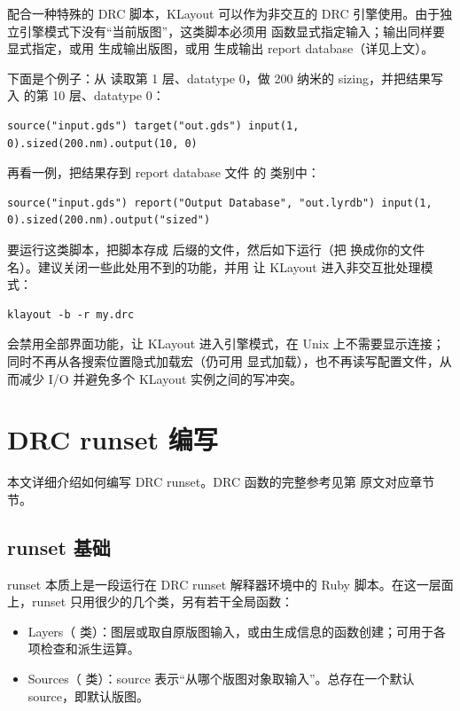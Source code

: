 配合一种特殊的 DRC 脚本，KLayout 可以作为非交互的 DRC 引擎使用。由于独立引擎模式下没有“当前版图”，这类脚本必须用  函数显式指定输入；输出同样要显式指定，或用  生成输出版图，或用  生成输出 report database（详见上文）。

下面是个例子：从  读取第 1 层、datatype 0，做 200 纳米的 sizing，并把结果写入  的第 10 层、datatype 0：

\begin{lstlisting}
source("input.gds") target("out.gds") input(1, 0).sized(200.nm).output(10, 0)
\end{lstlisting}

再看一例，把结果存到 report database 文件  的  类别中：

\begin{lstlisting}
source("input.gds") report("Output Database", "out.lyrdb") input(1, 0).sized(200.nm).output("sized")
\end{lstlisting}

要运行这类脚本，把脚本存成  后缀的文件，然后如下运行（把  换成你的文件名）。建议关闭一些此处用不到的功能，并用  让 KLayout 进入非交互批处理模式：

\begin{lstlisting}
klayout -b -r my.drc
\end{lstlisting}

 会禁用全部界面功能，让 KLayout 进入引擎模式，在 Unix 上不需要显示连接；同时不再从各搜索位置隐式加载宏（仍可用  显式加载），也不再读写配置文件，从而减少 I/O 并避免多个 KLayout 实例之间的写冲突。

\section{DRC runset 编写}\label{sec:drc_runsets}

本文详细介绍如何编写 DRC runset。DRC 函数的完整参考见第 原文对应章节 节。

\subsection{runset 基础}

runset 本质上是一段运行在 DRC runset 解释器环境中的 Ruby 脚本。在这一层面上，runset 只用很少的几个类，另有若干全局函数：

\begin{itemize}
\item Layers（ 类）：图层或取自原版图输入，或由生成信息的函数创建；可用于各项检查和派生运算。
\item Sources（ 类）：source 表示“从哪个版图对象取输入”。总存在一个默认 source，即默认版图。
\end{itemize}

